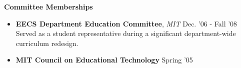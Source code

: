 \documentclass[margin]{res}
\begin{document}
\begin{resume}
		 {\bf  Committee Memberships}  
                 \begin{itemize}[leftmargin=*] %
\item {\bf EECS Department Education Committee}, {\it MIT} \hfill Dec. '06 - Fall '08 \\
Served as a student representative during a significant department-wide curriculum redesign.
\item {\bf MIT Council on Educational Technology} \hfill Spring '05 
 \end{itemize}
		 


          

		
		 


 
 
 


 
%		 
		
 
		

		 


\end{resume}
\end{document}

